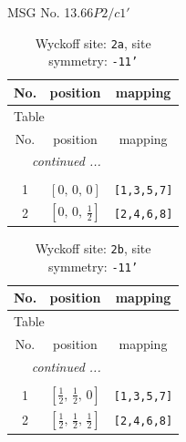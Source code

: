 \documentclass[fleqn,8pt]{jsarticle}
\begin{document}
\setcounter{MaxMatrixCols}{32}

\renewcommand{\tablename}{Table~}
\renewcommand{\figurename}{Figure~}
\begin{center}
\LARGE
MSG No. 13.66\quad$P2/c1'$
\end{center}
\renewcommand{\arraystretch}{1.2}
\begin{longtable}{ccc}
\caption{Wyckoff site: {\tt 2a}, site symmetry: {\tt -11'}}
 \\
 \hline \hline
No. & position & mapping \\ \hline \endfirsthead

\multicolumn{2}{l}{\tablename\ \thetable{}} \\
 \hline \hline
No. & position & mapping \\ \hline \endhead

 \hline \hline
\multicolumn{2}{r}{\footnotesize\it continued ...} \\ \endfoot

 \hline \hline
\multicolumn{2}{r}{} \\ \endlastfoot

1 & $\left[ 0,\, 0,\, 0 \right]$ & {\tt [1,3,5,7]} \\ \hline
2 & $\left[ 0,\, 0,\, \frac{1}{2} \right]$ & {\tt [2,4,6,8]} \\
\end{longtable}
\renewcommand{\arraystretch}{1.2}
\begin{longtable}{ccc}
\caption{Wyckoff site: {\tt 2b}, site symmetry: {\tt -11'}}
 \\
 \hline \hline
No. & position & mapping \\ \hline \endfirsthead

\multicolumn{2}{l}{\tablename\ \thetable{}} \\
 \hline \hline
No. & position & mapping \\ \hline \endhead

 \hline \hline
\multicolumn{2}{r}{\footnotesize\it continued ...} \\ \endfoot

 \hline \hline
\multicolumn{2}{r}{} \\ \endlastfoot

1 & $\left[ \frac{1}{2},\, \frac{1}{2},\, 0 \right]$ & {\tt [1,3,5,7]} \\ \hline
2 & $\left[ \frac{1}{2},\, \frac{1}{2},\, \frac{1}{2} \right]$ & {\tt [2,4,6,8]} \\
\end{longtable}
\end{document}
